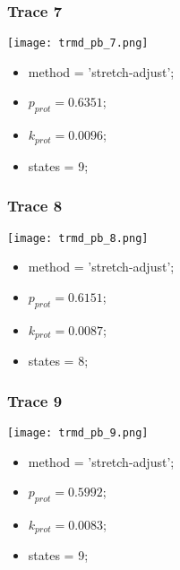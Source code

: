 \subsubsection{Trace 7}
\begin{minipage}[c]{0.7\textwidth}
	\texttt{[image: trmd\_pb\_7.png]}
\end{minipage}
\hfill
\begin{minipage}[c]{0.45\textwidth}
	\begin{itemize}
		\item method = 'stretch-adjust';
		\item $p_{prot}=0.6351$;
		\item $k_{prot}=0.0096$;
		\item states = 9;
	\end{itemize}
\end{minipage}

\subsubsection{Trace 8}
\begin{minipage}[c]{0.7\textwidth}
	\texttt{[image: trmd\_pb\_8.png]}
\end{minipage}
\hfill
\begin{minipage}[c]{0.45\textwidth}
	\begin{itemize}
		\item method = 'stretch-adjust';
		\item $p_{prot}=0.6151$;
		\item $k_{prot}=0.0087$;
		\item states = 8;
	\end{itemize}
\end{minipage}

\subsubsection{Trace 9}
\begin{minipage}[c]{0.7\textwidth}
	\texttt{[image: trmd\_pb\_9.png]}
\end{minipage}
\hfill
\begin{minipage}[c]{0.45\textwidth}
	\begin{itemize}
		\item method = 'stretch-adjust';
		\item $p_{prot}=0.5992$;
		\item $k_{prot}=0.0083$;
		\item states = 9;
	\end{itemize}
\end{minipage}

